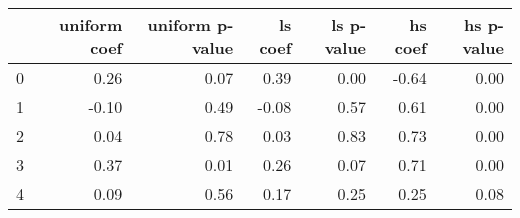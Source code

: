 \begin{tabular}{lrrrrrr}
\toprule
 & uniform coef & uniform p-value & ls coef & ls p-value & hs coef & hs p-value \\
\midrule
0 & 0.26 & 0.07 & 0.39 & 0.00 & -0.64 & 0.00 \\
1 & -0.10 & 0.49 & -0.08 & 0.57 & 0.61 & 0.00 \\
2 & 0.04 & 0.78 & 0.03 & 0.83 & 0.73 & 0.00 \\
3 & 0.37 & 0.01 & 0.26 & 0.07 & 0.71 & 0.00 \\
4 & 0.09 & 0.56 & 0.17 & 0.25 & 0.25 & 0.08 \\
\bottomrule
\end{tabular}
